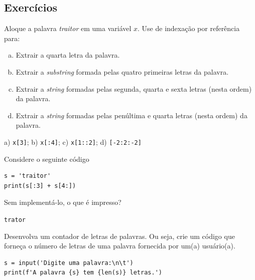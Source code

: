 \subsection{Exercícios}

\begin{exer}
  Aloque a palavra \textit{traitor} em uma variável $x$. Use de indexação por referência para:
  \begin{enumerate}[a)]
  \item Extrair a quarta letra da palavra.
  \item Extrair a \textit{substring} formada pelas quatro primeiras letras da palavra.
  \item Extrair a \textit{string} formadas pelas segunda, quarta e sexta letras (nesta ordem) da palavra.
  \item Extrair a \textit{string} formadas pelas penúltima e quarta letras (nesta ordem) da palavra.
  \end{enumerate}
\end{exer}
\begin{resp}
  a) \lstinline+x[3]+; b) \lstinline+x[:4]+; c) \lstinline+x[1::2]+; d) \lstinline+[-2:2:-2]+
\end{resp}

\begin{exer}
  Considere o seguinte código

  \begin{lstlisting}
s = 'traitor'
print(s[:3] + s[4:])
\end{lstlisting}

Sem implementá-lo, o que é impresso?
\end{exer}
\begin{resp}
  \lstinline+trator+
\end{resp}

\begin{exer}
  Desenvolva um contador de letras de palavras. Ou seja, crie um código que forneça o número de letras de uma palavra fornecida por um(a) usuário(a).
\end{exer}
\begin{resp}

\begin{lstlisting}
s = input('Digite uma palavra:\n\t')
print(f'A palavra {s} tem {len(s)} letras.')
\end{lstlisting}

\end{resp}

